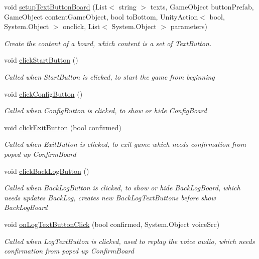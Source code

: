 \begin{DoxyCompactItemize}
void \hyperlink{classdoki_unity_1_1_world_control_aa15a36423abbd488ef87725cb87b855f}{setup\+Text\+Button\+Board} (List$<$ string $>$ texts, Game\+Object button\+Prefab, Game\+Object content\+Game\+Object, bool to\+Bottom, Unity\+Action$<$ bool, System.\+Object $>$ onclick, List$<$ System.\+Object $>$ parameters)
\begin{DoxyCompactList}\small\item\em Create the content of a board, which content is a set of Text\+Button. \end{DoxyCompactList}\item 
void \hyperlink{classdoki_unity_1_1_world_control_aa2fbdb1bc8a27514eaa3a4e4d0159a8d}{click\+Start\+Button} ()
\begin{DoxyCompactList}\small\item\em Called when Start\+Button is clicked, to start the game from beginning \end{DoxyCompactList}\item 
void \hyperlink{classdoki_unity_1_1_world_control_ab2b13cf5edc7d185474a4c0f45fffbce}{click\+Config\+Button} ()
\begin{DoxyCompactList}\small\item\em Called when Config\+Button is clicked, to show or hide Config\+Board \end{DoxyCompactList}\item 
void \hyperlink{classdoki_unity_1_1_world_control_a468630c51ee248f187a3451e58e3e404}{click\+Exit\+Button} (bool confirmed)
\begin{DoxyCompactList}\small\item\em Called when Exit\+Button is clicked, to exit game which needs confirmation from poped up Confirm\+Board \end{DoxyCompactList}\item 
void \hyperlink{classdoki_unity_1_1_world_control_ac84c65f22696cd7984b06b7ccb736f72}{click\+Back\+Log\+Button} ()
\begin{DoxyCompactList}\small\item\em Called when Back\+Log\+Button is clicked, to show or hide Back\+Log\+Board, which needs updates Back\+Log, creates new Back\+Log\+Text\+Buttons before show Back\+Log\+Board \end{DoxyCompactList}\item 
void \hyperlink{classdoki_unity_1_1_world_control_a82bcff41f6c6bb6ec848a87de10b1088}{on\+Log\+Text\+Button\+Click} (bool confirmed, System.\+Object voice\+Src)
\begin{DoxyCompactList}\small\item\em Called when Log\+Text\+Button is clicked, used to replay the voice audio, which needs confirmation from poped up Confirm\+Board \end{DoxyCompactList}\item 

\end{DoxyCompactItemize}
